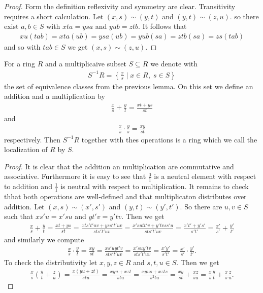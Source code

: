 \documentclass[../notes.tex]{subfiles}
\begin{document}
\begin{proof}
  Form the definition reflexivity and symmetry are clear. Transitivity requires a short
  calculation. Let $(x,s) \sim (y,t)$ and $(y,t) \sim (z,u)$. so there
  exist $a,b \in S$ with $xta = ysa$ and $yub = ztb$. It follows that
  \begin{align*}
    xu(tab) = xta(ub) = ysa(ub) = yub(sa) = ztb(sa) = zs(tab)
  \end{align*}
  and so with $tab \in S$ we get $(x,s) \sim (z,u)$.
\end{proof}

\begin{lemm}{}{}
  For a ring $R$ and a multiplicaive subset $S \subseteq R$ we denote with
  \begin{align*}
    S^{-1}R = \left\{\frac{x}{s} \mid x \in R, \; s \in S\right\}
  \end{align*}
  the set of equivalence classes from the previous lemma. On this set we define an
  addition and a multiplication by
  \begin{align*}
    \frac{x}{s} + \frac{y}{t} = \frac{xt + ys}{st}
  \end{align*}
  and
  \begin{align*}
    \frac{x}{s} \cdot \frac{y}{s} = \frac{xy}{st}
  \end{align*}
  respectively. Then $S^{-1}R$ together with thes operations is a ring which we
  call the localization of $R$ by $S$.
\end{lemm}

\begin{proof}
  It is clear that the addition an multiplication are commutative and associative. Furthermore
  it is easy to see that $\frac{0}{1}$ is a neutral element with respect to addition
  and $\frac{1}{1}$ is neutral with respect to multiplication.
  It remains to check thhat both operations are well-defined and that
  multiplicaton distributes over addition. Let $(x,s) \sim (x',s')$ and
  $(y,t) \sim (y', t')$. So there are $u,v \in S$ such that $xs'u = x'su$ and
  $yt'v = y'tv$. Then we get
  \begin{align*}
    \frac{x}{s} + \frac{y}{t} = \frac{xt + ys}{st} = \frac{xts't'uv + yss't'uv}{sts't'uv}
    = \frac{x'sutt'v + y'tvss'u}{sts't'uv} = \frac{x't' + y's'}{s't'}
    = \frac{x'}{s'} + \frac{y'}{t'}
  \end{align*}
  and similarly we compute
  \begin{align*}
    \frac{x}{s} \cdot \frac{y}{t} = \frac{xy}{st} = \frac{xs'uyt'v}{sts't'uv} =
    \frac{x'suy'tv}{sts't'uv} = \frac{x'y'}{s't'} = \frac{x'}{s'} \cdot \frac{y'}{t'}.
  \end{align*}
  To check the distributivity let $x,y,z \in R$ and $s,t,u \in S$. Then we get
  \begin{align*}
    \frac{x}{s} \left( \frac{y}{t} + \frac{z}{u} \right) =
    \frac{x(yu + zt)}{stu} = \frac{xyu + xzt}{stu} = \frac{xyus + xzts}{s^2tu}
    = \frac{xy}{st} + \frac{xz}{su} = \frac{x}{s} \frac{y}{t} + \frac{x}{s} \frac{z}{u}.
  \end{align*}
\end{proof}
\end{document}

